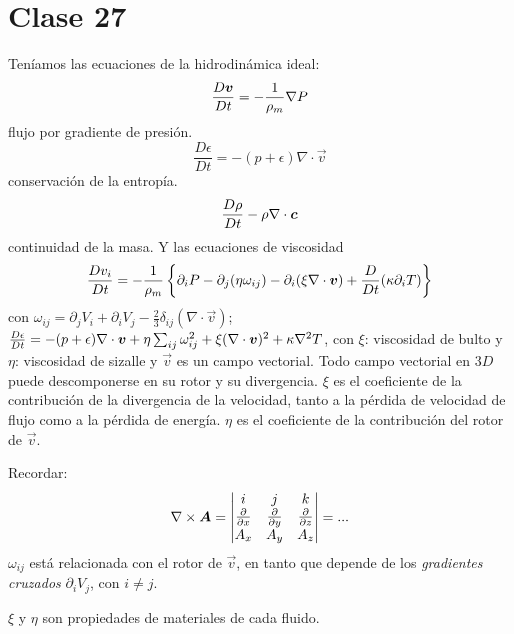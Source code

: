 \section{Clase 27}
Teníamos las ecuaciones de la hidrodinámica ideal:
\begin{equation}
  \frac{D\vb*{v}}{Dt}=-\frac{1}{\rho_m}\nabla P
\end{equation}
flujo por gradiente de presión.
\begin{equation}
  \frac{D\epsilon}{Dt}=-(p+\epsilon)\nabla\cdot\vec{v}
\end{equation}
conservación de la entropía.
\begin{equation}
  \frac{D\rho }{Dt}-\rho\nabla\cdot\vb*{c}
\end{equation}
continuidad de la masa.
Y las ecuaciones de viscosidad
\begin{equation}
 \frac{D v_i}{Dt}=-\frac{1}{\rho_m}\left\{\partial_iP-\partial_j(\eta\omega_{ij})-\partial_i(\xi \nabla\cdot\vb*{v})+\frac{D}{Dt}(\kappa\partial_i T)\right\}
\end{equation}
con $\omega_{ij}=\partial_jV_i+\partial_iV_j-\frac{2}{3}\delta_{ij}(\nabla\cdot\vec{v})$; $\frac{D\epsilon}{Dt}=-(p+\epsilon)\nabla\cdot\vb*{v}+\eta\sum_{ij}\omega_{ij}^2+\xi (\nabla\cdot\vb*{v})^2+\kappa \nabla^2T$, con $\xi $: viscosidad de bulto y $\eta$: viscosidad de sizalle y $\vec{v	}$ es un campo vectorial. Todo campo vectorial en $3D$ puede descomponerse en su rotor y su divergencia. $\xi$ es el coeficiente de la contribución de la divergencia de la velocidad, tanto a la pérdida de velocidad de flujo como a la pérdida de energía. $\eta$ es el coeficiente de la contribución del rotor de $\vec{v}$. 

Recordar:
\begin{equation}
  \nabla\times\vec{A}=\mqty|i&j&k\\\pdv{x}&\pdv{y}&\pdv{z}\\A_x&A_y&A_z|=...
\end{equation}
$\omega_{ij}$ está relacionada con el rotor de $\vec{v}$, en tanto que depende de los \textit{gradientes cruzados} $\partial_iV_j$, con $i\neq j$.

$\xi$ y $\eta$ son propiedades de materiales de cada fluido.

